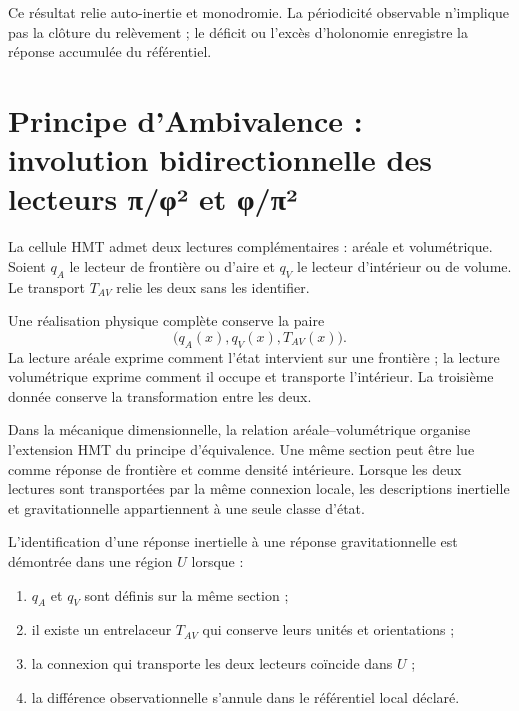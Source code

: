Ce résultat relie auto-inertie et monodromie. La périodicité observable
n'implique pas la clôture du relèvement ; le déficit ou l'excès d'holonomie enregistre la
réponse accumulée du référentiel.

\section{Principe d'Ambivalence : involution bidirectionnelle des lecteurs π/φ² et φ/π²}

La cellule HMT admet deux lectures complémentaires : aréale et volumétrique. Soient
\(q_A\) le lecteur de frontière ou d'aire et \(q_V\) le lecteur d'intérieur ou de
volume. Le transport \(T_{AV}\) relie les deux sans les identifier.

\begin{principle}
Une réalisation physique complète conserve la paire
\begin{equation}
 \bigl(q_A(x),q_V(x),T_{AV}(x)\bigr).
 \label{eq:ambivalencia-av}
\end{equation}
La lecture aréale exprime comment l'état intervient sur une frontière ; la lecture
volumétrique exprime comment il occupe et transporte l'intérieur. La troisième donnée
conserve la transformation entre les deux.
\end{principle}

Dans la mécanique dimensionnelle, la relation aréale--volumétrique organise
l'extension HMT du principe d'équivalence. Une même section peut être lue
comme réponse de frontière et comme densité intérieure. Lorsque les deux lectures
sont transportées par la même connexion locale, les descriptions inertielle et
gravitationnelle appartiennent à une seule classe d'état.

\begin{criterion}
L'identification d'une réponse inertielle à une réponse gravitationnelle
est démontrée dans une région \(U\) lorsque :
\begin{enumerate}
 \item \(q_A\) et \(q_V\) sont définis sur la même section ;
 \item il existe un entrelaceur \(T_{AV}\) qui conserve leurs unités et
       orientations ;
 \item la connexion qui transporte les deux lecteurs coïncide dans \(U\) ;
 \item la différence observationnelle s'annule dans le référentiel local déclaré.
\end{enumerate}
\end{criterion}

